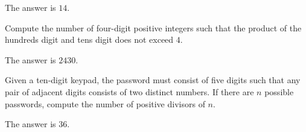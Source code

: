 \begin{solution}
The answer is $14$.
\end{solution}

\begin{problem}
Compute the number of four-digit positive integers such that the product of the hundreds digit and tens digit does not exceed $4$.
\end{problem}

\begin{solution}
The answer is $2430$.
\end{solution}

\begin{problem}
Given a ten-digit keypad, the password must consist of five digits such that any pair of adjacent digits consists of two distinct numbers. If there are $n$ possible passwords, compute the number of positive divisors of $n$.
\end{problem}

\begin{solution}
The answer is $36$.
\end{solution}